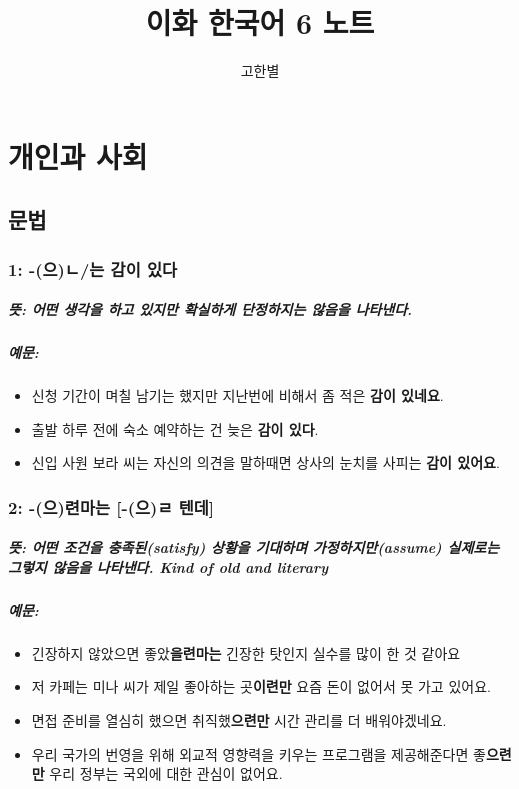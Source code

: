 \documentclass[a4paper, 11pt, oneside]{book}
\begin{document}
\setcounter{secnumdepth}{0}
\begin{titlepage}
\title{\Huge 이화 한국어 6 노트}
\author{\Large 고한별}
\date{}
\maketitle
\end{titlepage}

\pagebreak

\chapter{개인과 사회}
\section{문법}

\subsection{1: -(으)ㄴ/는 감이 있다}
\paragraph{뜻: 어떤 생각을 하고 있지만 확실하게 단정하지는 않음을 나타낸다.}
\paragraph{예문:}
\begin{itemize}
	\item 신청 기간이 며칠 남기는 했지만 지난번에 비해서 좀 적은 \textbf{감이 있네요}.  
	\item 출발 하루 전에 숙소 예약하는 건 늦은 \textbf{감이 있다}.  
	\item 신입 사원 보라 씨는 자신의 의견을 말하때면 상사의 눈치를 사피는 \textbf{감이 있어요}.  
\end{itemize}

\subsection{2: -(으)련마는 [-(으)ㄹ 텐데]}
\paragraph{뜻: 어떤 조건을 충족된(satisfy) 상황을 기대하며 가정하지만(assume) 실제로는 그렇지 않음을 나타낸다. Kind of old and literary}
\paragraph{예문:}
\begin{itemize}
	\item 긴장하지 않았으면 좋았\textbf{을련마는} 긴장한 탓인지 실수를 많이 한 것 같아요 
	\item 저 카페는 미나 씨가 제일 좋아하는 곳\textbf{이련만} 요즘 돈이 없어서 못 가고 있어요.
	\item 면접 준비를 열심히 했으면 취직했\textbf{으련만} 시간 관리를 더 배워야겠네요. 
	\item 우리 국가의 번영을 위해 외교적 영향력을 키우는 프로그램을 제공해준다면 좋\textbf{으련만} 우리 정부는 국외에 대한 관심이 없어요.   
\end{itemize}
\end{document}

